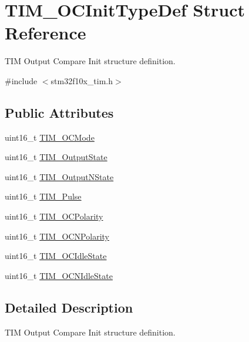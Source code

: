 \hypertarget{struct_t_i_m___o_c_init_type_def}{}\section{T\+I\+M\+\_\+\+O\+C\+Init\+Type\+Def Struct Reference}
\label{struct_t_i_m___o_c_init_type_def}


T\+IM Output Compare Init structure definition.  




{\ttfamily \#include $<$stm32f10x\+\_\+tim.\+h$>$}

\subsection*{Public Attributes}
\begin{DoxyCompactItemize}
\item 
uint16\+\_\+t \hyperlink{struct_t_i_m___o_c_init_type_def_ad4338ed2415b0d6d19589bf72b7ba3b0}{T\+I\+M\+\_\+\+O\+C\+Mode}
\item 
uint16\+\_\+t \hyperlink{struct_t_i_m___o_c_init_type_def_a2baca9c02d214d3125635a74e8d9aee4}{T\+I\+M\+\_\+\+Output\+State}
\item 
uint16\+\_\+t \hyperlink{struct_t_i_m___o_c_init_type_def_a933904d2f892d0b945a908b9257fe869}{T\+I\+M\+\_\+\+Output\+N\+State}
\item 
uint16\+\_\+t \hyperlink{struct_t_i_m___o_c_init_type_def_a186a3729af4e52f73f96590d805412a3}{T\+I\+M\+\_\+\+Pulse}
\item 
uint16\+\_\+t \hyperlink{struct_t_i_m___o_c_init_type_def_a9ed3e2de4700d008729a916d8ba78486}{T\+I\+M\+\_\+\+O\+C\+Polarity}
\item 
uint16\+\_\+t \hyperlink{struct_t_i_m___o_c_init_type_def_a3e47e672810747302c9d0626ae2ccb17}{T\+I\+M\+\_\+\+O\+C\+N\+Polarity}
\item 
uint16\+\_\+t \hyperlink{struct_t_i_m___o_c_init_type_def_a2a28f2d62339e06caef12816e04a8f55}{T\+I\+M\+\_\+\+O\+C\+Idle\+State}
\item 
uint16\+\_\+t \hyperlink{struct_t_i_m___o_c_init_type_def_a6cbbe6eb87c2ab49e4d68fa9703ce949}{T\+I\+M\+\_\+\+O\+C\+N\+Idle\+State}
\end{DoxyCompactItemize}


\subsection{Detailed Description}
T\+IM Output Compare Init structure definition. 

